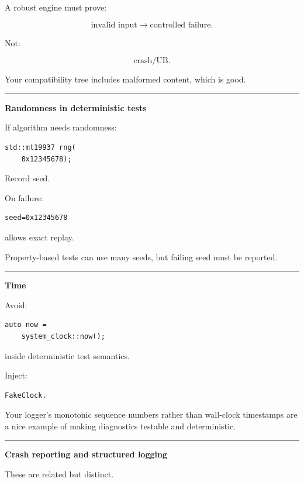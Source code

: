 A robust engine must prove:

\[
\text{invalid input}
\rightarrow
\text{controlled failure}.
\]

Not:

\[
\text{crash/UB}.
\]

Your compatibility tree includes malformed content, which is good.

\begin{center}\rule{0.5\linewidth}{0.5pt}\end{center}

\textbf{Randomness in deterministic tests}

If algorithm needs randomness:

\begin{verbatim}
std::mt19937 rng(
    0x12345678);
\end{verbatim}

Record seed.

On failure:

\begin{verbatim}
seed=0x12345678
\end{verbatim}

allows exact replay.

Property-based tests can use many seeds, but failing seed must be reported.

\begin{center}\rule{0.5\linewidth}{0.5pt}\end{center}

\textbf{Time}

Avoid:

\begin{verbatim}
auto now =
    system_clock::now();
\end{verbatim}

inside deterministic test semantics.

Inject:

\begin{verbatim}
FakeClock.
\end{verbatim}

Your logger's monotonic sequence numbers rather than wall-clock timestamps are a nice example of making diagnostics testable and deterministic.

\begin{center}\rule{0.5\linewidth}{0.5pt}\end{center}

\textbf{Crash reporting and structured logging}

These are related but distinct.

